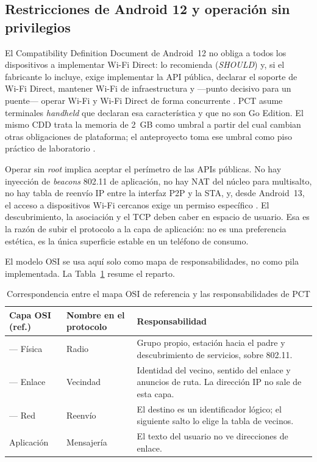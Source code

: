\documentclass[12pt,oneside]{scrreprt}
\begin{document}
\subsection{Restricciones de Android 12 y operación sin privilegios}
\label{sec:android-12}

El Compatibility Definition Document de Android~12 no obliga a todos los dispositivos a implementar Wi-Fi Direct: lo recomienda (\emph{SHOULD}) y, si el fabricante lo incluye, exige implementar la API pública, declarar el soporte de Wi-Fi Direct, mantener Wi-Fi de infraestructura y ---punto decisivo para un puente--- operar Wi-Fi y Wi-Fi Direct de forma concurrente \parencite{Google2021}. PCT asume terminales \emph{handheld} que declaran esa característica y que no son Go Edition. El mismo CDD trata la memoria de 2~GB como umbral a partir del cual cambian otras obligaciones de plataforma; el anteproyecto toma ese umbral como piso práctico de laboratorio \parencite{Google2021}.

Operar sin \emph{root} implica aceptar el perímetro de las APIs públicas. No hay inyección de \emph{beacons} 802.11 de aplicación, no hay NAT del núcleo para multisalto, no hay tabla de reenvío IP entre la interfaz P2P y la STA, y, desde Android~13, el acceso a dispositivos Wi-Fi cercanos exige un permiso específico \parencite{AndroidDevelopers2024,Google2021}. El descubrimiento, la asociación y el TCP deben caber en espacio de usuario. Esa es la razón de subir el protocolo a la capa de aplicación: no es una preferencia estética, es la única superficie estable en un teléfono de consumo.

El modelo OSI se usa aquí solo como mapa de responsabilidades, no como pila implementada. La Tabla~\ref{tab:osi-pct} resume el reparto.

\begin{table}[H]
\centering
\singlespacing
\caption{Correspondencia entre el mapa OSI de referencia y las responsabilidades de PCT}
\label{tab:osi-pct}
\renewcommand{\arraystretch}{1.05}
\begin{tabularx}{\textwidth}{@{} >{\raggedright\arraybackslash}p{2.6cm} >{\raggedright\arraybackslash}p{3.2cm} X @{}}
\toprule
Capa OSI (ref.) & Nombre en el protocolo & Responsabilidad \\
\midrule
1 --- Física & Radio & Grupo propio, estación hacia el padre y descubrimiento de servicios, sobre 802.11. \\
2 --- Enlace & Vecindad & Identidad del vecino, sentido del enlace y anuncios de ruta. La dirección IP no sale de esta capa. \\
3 --- Red & Reenvío & El destino es un identificador lógico; el siguiente salto lo elige la tabla de vecinos. \\
Aplicación & Mensajería & El texto del usuario no ve direcciones de enlace. \\
\bottomrule
\end{tabularx}
\end{table}
\end{document}
